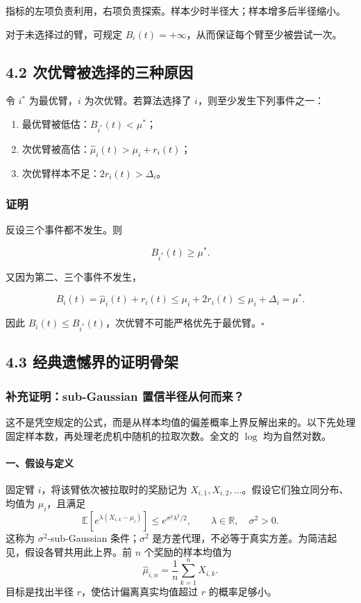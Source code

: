 \documentclass[
  11pt,
  a4paper,
]{ctexart}
\providecommand{\tightlist}{%
  \setlength{\itemsep}{0pt}\setlength{\parskip}{0pt}}
\begin{document}
指标的左项负责利用，右项负责探索。样本少时半径大；样本增多后半径缩小。

对于未选择过的臂，可规定
\(B_i(t)=+\infty\)，从而保证每个臂至少被尝试一次。

\subsection{4.2
次优臂被选择的三种原因}\label{ux6b21ux4f18ux81c2ux88abux9009ux62e9ux7684ux4e09ux79cdux539fux56e0}

令 \(i^*\) 为最优臂，\(i\) 为次优臂。若算法选择了
\(i\)，则至少发生下列事件之一：

\begin{enumerate}
\def\labelenumi{\arabic{enumi}.}
\tightlist
\item
  最优臂被低估：\(B_{i^*}(t)<\mu^*\)；
\item
  次优臂被高估：\(\widehat\mu_i(t)>\mu_i+r_i(t)\)；
\item
  次优臂样本不足：\(2r_i(t)>\Delta_i\)。
\end{enumerate}

\subsubsection{证明}\label{ux8bc1ux660e-5}

反设三个事件都不发生。则

\[
B_{i^*}(t)\ge\mu^*.
\]

又因为第二、三个事件不发生，

\[
B_i(t)=\widehat\mu_i(t)+r_i(t)
\le\mu_i+2r_i(t)
\le\mu_i+\Delta_i
=\mu^*.
\]

因此 \(B_i(t)\le B_{i^*}(t)\)，次优臂不可能严格优先于最优臂。\(\square\)

\subsection{4.3
经典遗憾界的证明骨架}\label{ux7ecfux5178ux9057ux61beux754cux7684ux8bc1ux660eux9aa8ux67b6}

\subsubsection*{补充证明：sub-Gaussian 置信半径从何而来？}

这不是凭空规定的公式，而是从样本均值的偏差概率上界反解出来的。以下先处理固定样本数，再处理老虎机中随机的拉取次数。全文的 \(\log\) 均为自然对数。

\paragraph{一、假设与定义}
固定臂 \(i\)，将该臂依次被拉取时的奖励记为
\(X_{i,1},X_{i,2},\ldots\)。假设它们独立同分布、均值为 \(\mu_i\)，且满足
\[
\mathbb E\!\left[e^{\lambda(X_{i,k}-\mu_i)}\right]
\le e^{\sigma^2\lambda^2/2},
\qquad \lambda\in\mathbb R,\quad \sigma^2>0.
\]
这称为 \(\sigma^2\)-sub-Gaussian 条件；\(\sigma^2\) 是方差代理，不必等于真实方差。为简洁起见，假设各臂共用此上界。前 \(n\) 个奖励的样本均值为
\[
\widehat\mu_{i,n}=\frac1n\sum_{k=1}^n X_{i,k}.
\]
目标是找出半径 \(r\)，使估计偏离真实均值超过 \(r\) 的概率足够小。
\end{document}
